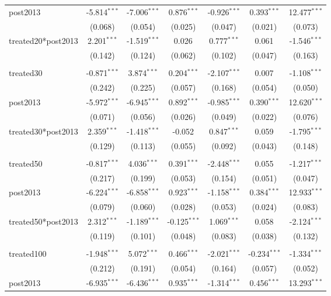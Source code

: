 \documentclass[12pt]{article}
\begin{document}
\begin{table}[!htbp]
\begin{tabular}{@{\extracolsep{5pt}}lcccccc}
 post2013 & -5.814$^{***}$ & -7.006$^{***}$ & 0.876$^{***}$ & -0.926$^{***}$ & 0.393$^{***}$ & 12.477$^{***}$ \\
  & (0.068) & (0.054) & (0.025) & (0.047) & (0.021) & (0.073) \\
 treated20*post2013 & 2.201$^{***}$ & -1.519$^{***}$ & 0.026$^{}$ & 0.777$^{***}$ & 0.061$^{}$ & -1.546$^{***}$ \\
  & (0.142) & (0.124) & (0.062) & (0.102) & (0.047) & (0.163) \\
\hline \\[-1.8ex]
 treated30 & -0.871$^{***}$ & 3.874$^{***}$ & 0.204$^{***}$ & -2.107$^{***}$ & 0.007$^{}$ & -1.108$^{***}$ \\
  & (0.242) & (0.225) & (0.057) & (0.168) & (0.054) & (0.050) \\
 post2013 & -5.972$^{***}$ & -6.945$^{***}$ & 0.892$^{***}$ & -0.985$^{***}$ & 0.390$^{***}$ & 12.620$^{***}$ \\
  & (0.071) & (0.056) & (0.026) & (0.049) & (0.022) & (0.076) \\
 treated30*post2013 & 2.359$^{***}$ & -1.418$^{***}$ & -0.052$^{}$ & 0.847$^{***}$ & 0.059$^{}$ & -1.795$^{***}$ \\
  & (0.129) & (0.113) & (0.055) & (0.092) & (0.043) & (0.148) \\
\hline \\[-1.8ex]
 treated50 & -0.817$^{***}$ & 4.036$^{***}$ & 0.391$^{***}$ & -2.448$^{***}$ & 0.055$^{}$ & -1.217$^{***}$ \\
  & (0.217) & (0.199) & (0.053) & (0.154) & (0.051) & (0.047) \\
 post2013 & -6.224$^{***}$ & -6.858$^{***}$ & 0.923$^{***}$ & -1.158$^{***}$ & 0.384$^{***}$ & 12.933$^{***}$ \\
  & (0.079) & (0.060) & (0.028) & (0.053) & (0.024) & (0.083) \\
 treated50*post2013 & 2.312$^{***}$ & -1.189$^{***}$ & -0.125$^{***}$ & 1.069$^{***}$ & 0.058$^{}$ & -2.124$^{***}$ \\
  & (0.119) & (0.101) & (0.048) & (0.083) & (0.038) & (0.132) \\
\hline \\[-1.8ex]
 treated100 & -1.948$^{***}$ & 5.072$^{***}$ & 0.466$^{***}$ & -2.021$^{***}$ & -0.234$^{***}$ & -1.334$^{***}$ \\
  & (0.212) & (0.191) & (0.054) & (0.164) & (0.057) & (0.052) \\
 post2013 & -6.935$^{***}$ & -6.436$^{***}$ & 0.935$^{***}$ & -1.314$^{***}$ & 0.456$^{***}$ & 13.293$^{***}$ \\

\end{tabular}
\end{table}
\end{document}
